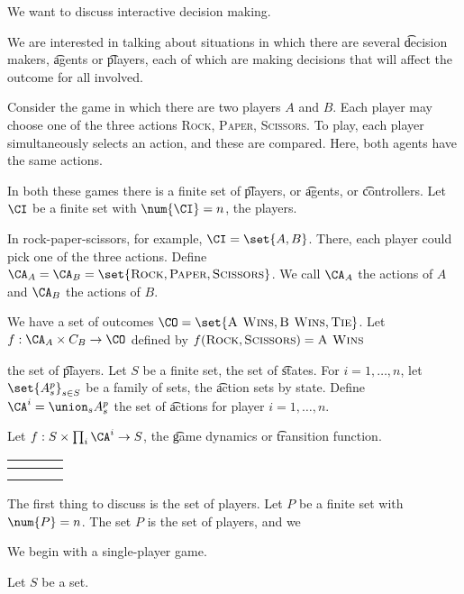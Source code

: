 

We want to discuss interactive decision making.


We are interested in talking about situations in which there are several \t{decision makers}, \t{agents} or \t{players}, each of which are making decisions that will affect the outcome for all involved.


Consider the game  in which there are two players $A$ and $B$.
Each player may choose one of the three actions \textsc{Rock}, \textsc{Paper}, \textsc{Scissors}.
To play, each player simultaneously selects an action, and these are compared.
Here, both agents have the same actions.


In both these games there is a finite set of \t{players}, or \t{agents}, or \t{controllers}.
Let $\CI$ be a finite set with $\num{\CI} = n$, the players.

In rock-paper-scissors, for example, $\CI = \set{A, B}$.
There, each player could pick one of the three actions.
Define $\CA_A = \CA_B = \set{\textsc{Rock}, \textsc{Paper}, \textsc{Scissors}}$.
We call $\CA_A$ the actions of $A$ and $\CA_B$ the actions of $B$.

We have a set of outcomes $\CO = \set{\textsc{A Wins}, \textsc{B Wins}, \textsc{Tie}}$.
Let $f: \CA_A \times C_B \to \CO$ defined by $f(\textsc{Rock}, \textsc{Scissors}) = \textsc{A Wins}$

 the set of \t{players}.
Let $S$ be a finite set, the set of \t{states}.
For $i = 1, \dots, n$, let $\set{A^p_s}_{s \in S}$ be a family of sets, the \t{action sets by state}.
Define $\CA^i = \union_s A^p_s$ the set of \t{actions} for player $i = 1, \dots, n$.

Let $f: S \times \prod_{i} \CA^i \to S$, the \t{game dynamics} or \t{transition function}.

{\tiny
\begin{tabular}{c|c|c}
	 & $\;\,$ & $\;\,$ \\
	\hline
	& & \\
	\hline
	& &
\end{tabular}
}






The first thing to discuss is the set of players.
Let $P$ be a finite set with $\num{P} = n$.
The set $P$ is the set of players, and we

We begin with a single-player game.

Let $S$ be a set.

\blankpage
